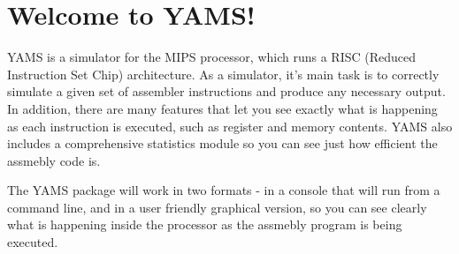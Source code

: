 

\section{Welcome to YAMS!}

YAMS is a simulator for the MIPS processor, which runs a RISC (Reduced Instruction Set Chip) architecture.  As a simulator, it's main task is to correctly simulate a given set of assembler instructions and produce any necessary output.  In addition, there are many features that let you see exactly what is happening as each instruction is executed, such as register and memory contents.  YAMS also includes a comprehensive statistics module so you can see just how efficient the assmebly code is.

The YAMS package will work in two formats - in a console that will run from a command line, and in a user friendly graphical version, so you can see clearly what is happening inside the processor as the assmebly program is being executed.









